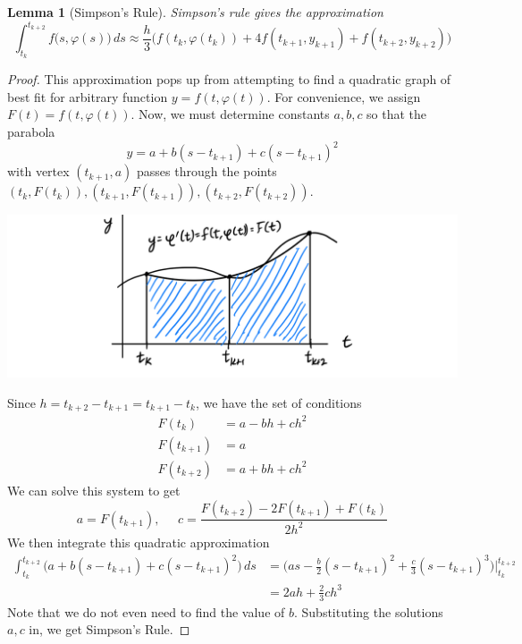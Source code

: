 \documentclass{article}
\newtheorem{lemma}[theorem]{Lemma}
\theoremstyle{remark}
\theoremstyle{definition}
\begin{document}
\begin{lemma}[Simpson's Rule]
\textit{Simpson's rule} gives the approximation 
\[\int_{t_k}^{t_{k+2}} f\big(s, \varphi(s)\big)\,ds \approx \frac{h}{3} \big( f(t_k, \varphi(t_k)) + 4 f (t_{k+1}, y_{k+1}) + f(t_{k+2}, y_{k+2})\big)\]
\end{lemma}
\begin{proof}
This approximation pops up from attempting to find a quadratic graph of best fit for arbitrary function $y = f(t, \varphi(t))$. For convenience, we assign $F(t) = f(t, \varphi(t))$. Now, we must determine constants $a, b, c$ so that the parabola
\[y = a + b(s - t_{k+1}) + c(s - t_{k+1})^2\]
with vertex $(t_{k+1}, a)$ passes through the points $(t_k, F(t_k)), (t_{k+1}, F(t_{k+1})), (t_{k+2}, F(t_{k+2}))$. 
\begin{center}
    \includegraphics[scale=0.27]{img/Quadratic_Milne.PNG}
\end{center}
Since $h = t_{k+2} - t_{k+1} = t_{k+1} - t_k$, we have the set of conditions
\begin{align*}
    F(t_k) & = a - bh + ch^2 \\
    F(t_{k+1}) & = a \\
    F(t_{k+2}) & = a + bh + ch^2
\end{align*}
We can solve this system to get
\[a = F(t_{k+1}), \;\;\;\;\; c = \frac{F(t_{k+2}) - 2 F (t_{k+1}) + F(t_k)}{2 h^2}\]
We then integrate this quadratic approximation
\begin{align*}
    \int_{t_k}^{t_{k+2}} \big( a + b(s - t_{k+1}) + c(s - t_{k+1})^2 \big) \,ds & = \bigg( as - \frac{b}{2} (s - t_{k+1})^2 + \frac{c}{3} (s - t_{k+1})^3 \bigg) \bigg|^{t_{k+2}}_{t_k} \\
    & = 2 ah + \frac{2}{3} ch^3
\end{align*}
Note that we do not even need to find the value of $b$. Substituting the solutions $a, c$ in, we get Simpson's Rule. 
\end{proof}
\end{document}
